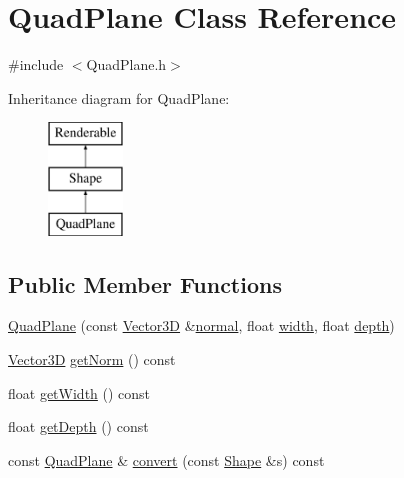 \hypertarget{class_quad_plane}{\section{Quad\-Plane Class Reference}
\label{class_quad_plane}
}


{\ttfamily \#include $<$Quad\-Plane.\-h$>$}

Inheritance diagram for Quad\-Plane\-:\begin{figure}[H]
\begin{center}
\leavevmode
\includegraphics[height=3.000000cm]{class_quad_plane}
\end{center}
\end{figure}
\subsection*{Public Member Functions}
\begin{DoxyCompactItemize}
\item 
\hyperlink{class_quad_plane_ad5eaf38803814c882f5a458f4b0cc786}{Quad\-Plane} (const \hyperlink{class_vector3_d}{Vector3\-D} \&\hyperlink{class_quad_plane_af4e1dfc6a945fca065e6ab9387c05223}{normal}, float \hyperlink{class_quad_plane_aee2609c9c822afa7bc7397c190951bb5}{width}, float \hyperlink{class_quad_plane_a38aaa492e76f934ff0661e234ba6c19a}{depth})
\item 
\hyperlink{class_vector3_d}{Vector3\-D} \hyperlink{class_quad_plane_a1247c6efc9733e72da8b5ae09e560d78}{get\-Norm} () const 
\item 
float \hyperlink{class_quad_plane_a77004e91a9e7055234712629d0c3678d}{get\-Width} () const 
\item 
float \hyperlink{class_quad_plane_a5e5ebfcdad195a6a14e57669ac0a4c2e}{get\-Depth} () const 
\item 
const \hyperlink{class_quad_plane}{Quad\-Plane} \& \hyperlink{class_quad_plane_a385157caf428a4143c81440f9d2d0943}{convert} (const \hyperlink{class_shape}{Shape} \&s) const 
\end{DoxyCompactItemize}
